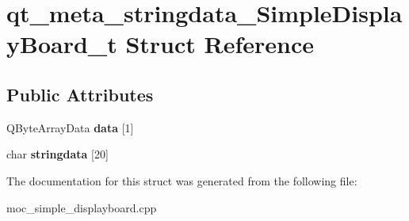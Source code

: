 \hypertarget{structqt__meta__stringdata__SimpleDisplayBoard__t}{\section{qt\-\_\-meta\-\_\-stringdata\-\_\-\-Simple\-Display\-Board\-\_\-t Struct Reference}
\label{structqt__meta__stringdata__SimpleDisplayBoard__t}
}
\subsection*{Public Attributes}
\begin{DoxyCompactItemize}
\item 
\hypertarget{structqt__meta__stringdata__SimpleDisplayBoard__t_a414e56c0cbf1486ed0a5f14f2285ba84}{Q\-Byte\-Array\-Data {\bfseries data} \mbox{[}1\mbox{]}}\label{structqt__meta__stringdata__SimpleDisplayBoard__t_a414e56c0cbf1486ed0a5f14f2285ba84}

\item 
\hypertarget{structqt__meta__stringdata__SimpleDisplayBoard__t_a425b53b690b9e87a3311f9b2bd1815a3}{char {\bfseries stringdata} \mbox{[}20\mbox{]}}\label{structqt__meta__stringdata__SimpleDisplayBoard__t_a425b53b690b9e87a3311f9b2bd1815a3}

\end{DoxyCompactItemize}


The documentation for this struct was generated from the following file\-:\begin{DoxyCompactItemize}
\item 
moc\-\_\-simple\-\_\-displayboard.\-cpp\end{DoxyCompactItemize}

